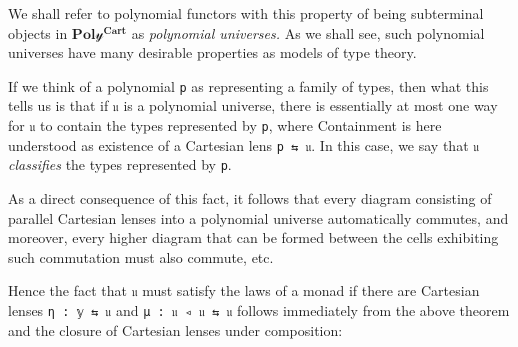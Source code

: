\documentclass[
  11pt,
  oneside,
  article]{memoir}
\theoremstyle{definition}
\theoremstyle{plain}
\newcommand{\yon}{\mathcal{y}}
\newcommand{\0}{\textsf{0}}
\newcommand{\1}{\tn{\textsf{1}}}
\begin{document}
We shall refer to polynomial functors with this property of being
subterminal objects in \(\mathbf{Pol\yon^{Cart}}\) as \emph{polynomial
universes.} As we shall see, such polynomial universes have many
desirable properties as models of type theory.

If we think of a polynomial \texttt{p} as representing a family of
types, then what this tells us is that if \texttt{𝔲} is a polynomial
universe, there is essentially at most one way for \texttt{𝔲} to contain
the types represented by \texttt{p}, where Containment is here
understood as existence of a Cartesian lens \texttt{p\ ⇆\ 𝔲}. In this
case, we say that \texttt{𝔲} \emph{classifies} the types represented by
\texttt{p}.

As a direct consequence of this fact, it follows that every diagram
consisting of parallel Cartesian lenses into a polynomial universe
automatically commutes, and moreover, every higher diagram that can be
formed between the cells exhibiting such commutation must also commute,
etc.

Hence the fact that \texttt{𝔲} must satisfy the laws of a monad if there
are Cartesian lenses \texttt{η\ :\ 𝕪\ ⇆\ 𝔲} and
\texttt{μ\ :\ 𝔲\ ◃\ 𝔲\ ⇆\ 𝔲} follows immediately from the above theorem
and the closure of Cartesian lenses under composition:
\end{document}
